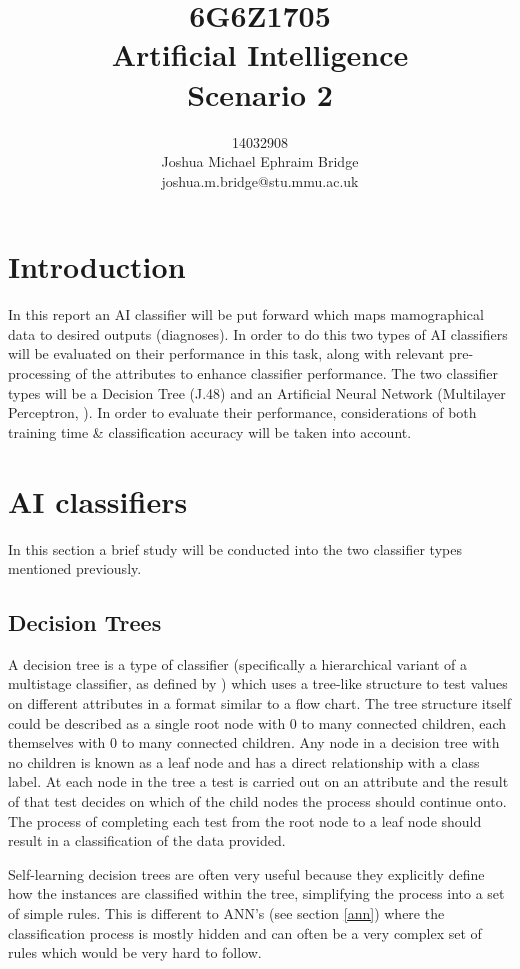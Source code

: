 \documentclass[12pt]{article}
\title{\vspace{2cm}6G6Z1705\\\textbf{Artificial Intelligence}\\\vspace{2cm}Scenario 2\\\vspace{2cm}}
\author{14032908\\Joshua Michael Ephraim Bridge\\joshua.m.bridge@stu.mmu.ac.uk\\\vspace{1cm}}
\begin{document}
\maketitle

\newpage

\onehalfspacing

\section{Introduction}
  In this report an AI classifier will be put forward which maps mamographical data to desired outputs (diagnoses). In order to do this two types of AI classifiers will be evaluated on their performance in this task, along with relevant pre-processing of the attributes to enhance classifier performance. The two classifier types will be a Decision Tree (J.48) and an Artificial Neural Network (Multilayer Perceptron, \cite{minsky2017perceptrons}). In order to evaluate their performance, considerations of both training time \& classification accuracy will be taken into account.

\section{AI classifiers}
  In this section a brief study will be conducted into the two classifier types mentioned previously.

  \subsection{Decision Trees} \label{res-destrees}
    A decision tree is a type of classifier (specifically a hierarchical variant of a multistage classifier, as defined by \cite{safavian1991survey}) which uses a tree-like structure to test values on different attributes in a format similar to a flow chart. The tree structure itself could be described as a single root node with 0 to many connected children, each themselves with 0 to many connected children. Any node in a decision tree with no children is known as a leaf node and has a direct relationship with a class label. At each node in the tree a test is carried out on an attribute and the result of that test decides on which of the child nodes the process should continue onto. The process of completing each test from the root node to a leaf node should result in a classification of the data provided.

    Self-learning decision trees are often very useful because they explicitly define how the instances are classified within the tree, simplifying the process into a set of simple rules. This is different to ANN's (see section \ref{ann}) where the classification process is mostly hidden and can often be a very complex set of rules which would be very hard to follow.
\end{document}
